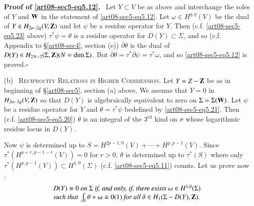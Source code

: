 \noindent
{\bf Proof of \eqref{art08-sec5-eq5.12}.}~ Let $Y\subset V$ be as above and interchange the roles of $Y$ and $\mathbf{W}$ in the statement of \eqref{art08-sec5-eq5.12}. Let $\omega\in H^{q,q}(V)$ be the dual of $Y\in H_{2n-2q}(V,\mathbf{Z})$ and let $\psi$ be a residue operator for $Y$. Then (c.f. \eqref{art08-sec5-eq5.23} above) $\tau^{*}\psi=\theta$ is a residue operator for $D(Y)\subset \Sigma$, and so (c.f. Appendix to \S\ref{art08-sec4}, section (e)) $\overline{\partial}\theta$ is the dual of $D(Y)\in H_{2N-2}(\Sigma,\mathbf{Z})(N=\dim \Sigma)$. But $\overline{\partial}\theta=\tau^{*}\overline{\partial}\psi=\tau^{*}\omega$, and so \eqref{art08-sec5-eq5.12} is proved.\hfill$\square$

\medskip
(b)~ \textsc{Reciprocity Relations in Higher Codimension.} Let $Y=Z-\mathbf{Z}$ be as in beginning of \S\ref{art08-sec5}, section (a) above. We assume that $Y=0$ in $H_{2n-2q}(V,\mathbf{Z})$ so that $D(Y)$ is algebraically equivalent to zero on $\Sigma=\Sigma(\mathbf{W})$. Let $\psi$ be a residue operator for $Y$ and $\theta=\tau^{*}\psi$ be\pageoriginale defined by \eqref{art08-sec5-eq5.21}. Then (c.f. \eqref{art08-sec5-eq5.20}) $\theta$ is an integral of the $3^{\text{rd}}$ kind on $\sigma$ whose logarithmic residue locus in $D(Y)$.

Now $\psi$ is determined up to $S=H^{2p-1,0}(V)+\cdots+H^{p,p-1}(V)$. Since $\tau^{*}(H^{p+r,p-1-r}(V))=0$ for $r>0$, $\theta$ is determined up to $\tau^{*}(S)$ where only $\tau^{*}(H^{p,p-1}(V))\subset H^{1,0}(\Sigma)$ (c.f. \eqref{art08-sec5-eq5.11}) counts. Let us prove now :
\begin{equation}
\begin{array}{l}
D(Y)\equiv 0\text{~\em on~} \Sigma \text{~\em if, and only, if, there exists~}\omega\in H^{1,0}(\Sigma)\\
\text{\em such that~}\int_{\delta}\theta+\omega\equiv 0(1)\text{~\em for all~}\delta\in H_{1}(\Sigma-D(Y),\mathbf{Z}).
\end{array}\label{art08-sec5-eq5.24}
\end{equation}

